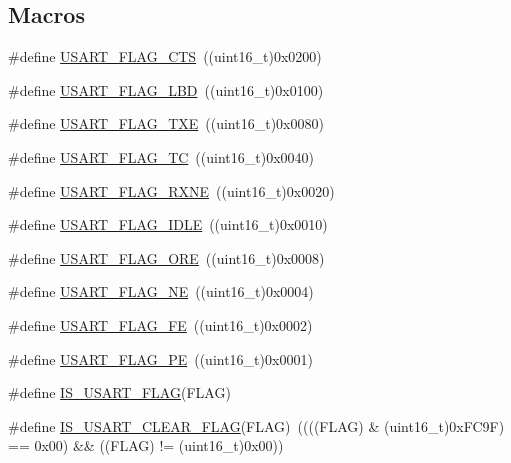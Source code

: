\subsection*{Macros}
\begin{DoxyCompactItemize}
\item 
\#define \hyperlink{group___u_s_a_r_t___flags_ga94b7272319cca88a65075d5cb6048441}{U\+S\+A\+R\+T\+\_\+\+F\+L\+A\+G\+\_\+\+C\+TS}~((uint16\+\_\+t)0x0200)
\item 
\#define \hyperlink{group___u_s_a_r_t___flags_ga27be6517de20ce14711f71dcd5a7b91f}{U\+S\+A\+R\+T\+\_\+\+F\+L\+A\+G\+\_\+\+L\+BD}~((uint16\+\_\+t)0x0100)
\item 
\#define \hyperlink{group___u_s_a_r_t___flags_ga7129f13333f2a7218838cc32fe507bfa}{U\+S\+A\+R\+T\+\_\+\+F\+L\+A\+G\+\_\+\+T\+XE}~((uint16\+\_\+t)0x0080)
\item 
\#define \hyperlink{group___u_s_a_r_t___flags_gae7b85c9e2cc86af5bbc8b8d8b854410f}{U\+S\+A\+R\+T\+\_\+\+F\+L\+A\+G\+\_\+\+TC}~((uint16\+\_\+t)0x0040)
\item 
\#define \hyperlink{group___u_s_a_r_t___flags_ga11d6b70c8f00216b6d8a43790dfdcf2f}{U\+S\+A\+R\+T\+\_\+\+F\+L\+A\+G\+\_\+\+R\+X\+NE}~((uint16\+\_\+t)0x0020)
\item 
\#define \hyperlink{group___u_s_a_r_t___flags_gac2f1ccc91a834f9cbec3f058872b972a}{U\+S\+A\+R\+T\+\_\+\+F\+L\+A\+G\+\_\+\+I\+D\+LE}~((uint16\+\_\+t)0x0010)
\item 
\#define \hyperlink{group___u_s_a_r_t___flags_gabdb285b5c1876d93f9c802f9304538d5}{U\+S\+A\+R\+T\+\_\+\+F\+L\+A\+G\+\_\+\+O\+RE}~((uint16\+\_\+t)0x0008)
\item 
\#define \hyperlink{group___u_s_a_r_t___flags_ga81781d27ffc8b85dfaf7b7b791229547}{U\+S\+A\+R\+T\+\_\+\+F\+L\+A\+G\+\_\+\+NE}~((uint16\+\_\+t)0x0004)
\item 
\#define \hyperlink{group___u_s_a_r_t___flags_ga3551a32bac49a2ec040e5fdafcc9c4bd}{U\+S\+A\+R\+T\+\_\+\+F\+L\+A\+G\+\_\+\+FE}~((uint16\+\_\+t)0x0002)
\item 
\#define \hyperlink{group___u_s_a_r_t___flags_ga5e87fde5704f27c75df25395e23404ad}{U\+S\+A\+R\+T\+\_\+\+F\+L\+A\+G\+\_\+\+PE}~((uint16\+\_\+t)0x0001)
\item 
\#define \hyperlink{group___u_s_a_r_t___flags_ga3e20747ce7c97a36718933c0cb3dac29}{I\+S\+\_\+\+U\+S\+A\+R\+T\+\_\+\+F\+L\+AG}(F\+L\+AG)
\item 
\#define \hyperlink{group___u_s_a_r_t___flags_gadc905fdce8defba31c00c95554a26bc3}{I\+S\+\_\+\+U\+S\+A\+R\+T\+\_\+\+C\+L\+E\+A\+R\+\_\+\+F\+L\+AG}(F\+L\+AG)~((((F\+L\+AG) \& (uint16\+\_\+t)0x\+F\+C9\+F) == 0x00) \&\& ((\+F\+L\+A\+G) != (uint16\+\_\+t)0x00))

\end{DoxyCompactItemize}
